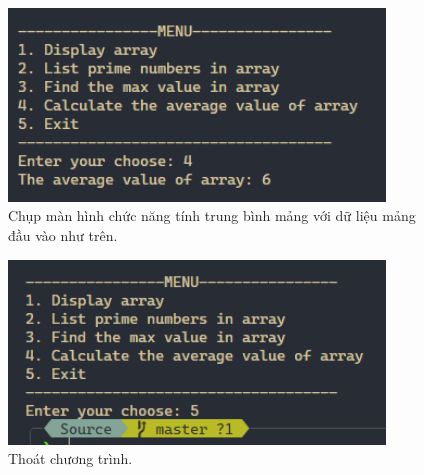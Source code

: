 \begin{figure}[H]
	\centering
	\includegraphics[width=10cm]{images/img5_4.PNG}
	\caption{Chụp màn hình chức năng tính trung bình mảng với dữ liệu mảng đầu vào như trên.}
\end{figure}

\begin{figure}[H]
	\centering
	\includegraphics[width=10cm]{images/img5_5.PNG}
	\caption{Thoát chương trình.}
\end{figure}


